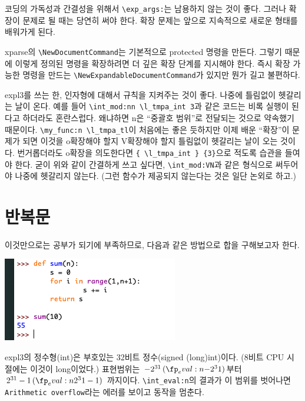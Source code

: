 \documentclass[a4paper,amsmath]{oblivoir}
\newcounter{sub}
\newcommand\bangotsuite{\stepcounter{sub}\thesub}
\begin{document}
코딩의 가독성과 간결성을 위해서 \verb|\exp_args:|는 남용하지 않는 것이 좋다. 그러나 확장이 문제로 될 때는 당연히 써야 한다. 확장 문제는 앞으로 지속적으로 새로운 형태를 배워가게 된다.

\medskip

\hangfrom{붙임 \bangotsuite: }\textsf{xparse}의 \verb|\NewDocumentCommand|는 기본적으로 protected 명령을 만든다. 그렇기 때문에 이렇게 정의된 명령을 확장하려면 더 깊은 확장 단계를 지시해야 한다. 즉시 확장 가능한 명령을 만드는 \verb|\NewExpandableDocumentCommand|가 있지만 뭔가 길고 불편하다.

\hangfrom{붙임 \bangotsuite: }expl3를 쓰는 한, 인자형에 대해서 규칙을 지켜주는 것이 좋다. 나중에 틀림없이 헷갈리는 날이 온다. 예를 들어 \verb|\int_mod:nn \l_tmpa_int 3|과 같은 코드는 비록 실행이 된다고 하더라도 혼란스럽다. 왜냐하면 n은 “중괄호 범위”로 전달되는 것으로 약속했기 때문이다.
\verb|\my_func:n \l_tmpa_tl|\allowbreak 이 처음에는 좋은 듯하지만 이제 배운 “확장”이 문제가 되면 이것을 o확장해야 할지 V확장해야 할지 틀림없이 헷갈리는 날이 오는 것이다.
번거롭더라도 o확장을 의도한다면 \verb|{ \l_tmpa_int } {3}|\allowbreak 으로 적도록 습관을 들여야 한다. 굳이 위와 같이 간결하게 쓰고 싶다면, \verb|\int_mod:VN|과 같은 형식으로 써두어야 나중에 헷갈리지 않는다. (그런 함수가 제공되지 않는다는 것은 일단 논외로 하고.)

\section{반복문}

이것만으로는 공부가 되기에 부족하므로, 다음과 같은 방법으로 합을 구해보고자 한다.

\medskip

\includegraphics[scale=.9]{screenshot-idle}

expl3의 정수형(\textsf{int})은 부호있는 32비트 정수(signed (long)int)이다. (8비트 CPU 시절에는 이것이 long이었다.) 표현범위는 
\ExplSyntaxOn
$-2^{31}\, (\fp_eval:n { -2^31 })$부터~
$2^{31}-1\, (\fp_eval:n { 2^31 -1 })$
\ExplSyntaxOff
까지이다. 
\verb|\int_eval:n|의 결과가 이 범위를 벗어나면 \texttt{Arithmetic overflow}라는 에러를 보이고 동작을 멈춘다.
\end{document}

